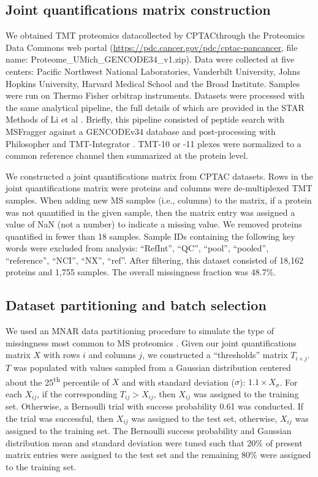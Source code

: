 \documentclass{article}
\begin{document}
\subsection{Joint quantifications matrix construction}
\label{sec:joint-mat}

We obtained TMT proteomics data\textemdash collected by CPTAC\textemdash through the Proteomics Data Commons web portal (\url{https://pdc.cancer.gov/pdc/cptac-pancancer}, file name: Proteome\_UMich\_GENCODE34\_v1.zip). Data were collected at five centers: Pacific Northwest National Laboratories, Vanderbilt University, Johns Hopkins University, Harvard Medical School and the Broad Institute. Samples were run on Thermo Fisher orbitrap instruments. Datasets were processed with the same analytical pipeline, the full details of which are provided in the STAR Methods of Li et al \cite{pan-cancer}. Briefly, this pipeline consisted of peptide search with MSFragger \cite{msfragger} against a GENCODEv34 database and post-processing with Philosopher \cite{philosopher} and TMT-Integrator \cite{msfragger}. TMT-10 or -11 plexes were normalized to a common reference channel then summarized at the protein level. 

We constructed a joint quantifications matrix from CPTAC datasets. Rows in the joint quantifications matrix were proteins and columns were de-multiplexed TMT samples. When adding new MS samples (i.e., columns) to the matrix, if a protein was not quantified in the given sample, then the matrix entry was assigned a value of NaN (not a number) to indicate a missing value. We removed proteins quantified in fewer than 18 samples. Sample IDs containing the following key words were excluded from analysis: ``RefInt'', ``QC'', ``pool'', ``pooled'', ``reference'', ``NCI'', ``NX'', ``ref''. After filtering, this dataset consisted of 18,162 proteins and 1,755 samples. The overall missingness fraction was 48.7\%. 

\subsection{Dataset partitioning and batch selection}
\label{sec:partition}

We used an MNAR data partitioning procedure to simulate the type of missingness most common to MS proteomics \cite{Bramer:review, Webb-Robertson:review, mengbo-2023}. Given our joint quantifications matrix $X$ with rows $i$ and columns $j$, we constructed a ``thresholds'' matrix $T_{i\times j}$. $T$ was populated with values sampled from a Gaussian distribution centered about the 25\textsuperscript{th} percentile of $X$ and with standard deviation ($\sigma$): $1.1\times X_{\sigma}$. For each $X_{ij}$, if the corresponding $T_{ij}$$>$$X_{ij}$, then $X_{ij}$ was assigned to the training set. Otherwise, a Bernoulli trial with success probability 0.61 was conducted. If the trial was successful, then $X_{ij}$ was assigned to the test set, otherwise, $X_{ij}$ was assigned to the training set. The Bernoulli success probability and Gaussian distribution mean and standard deviation were tuned such that 20\% of present matrix entries were assigned to the test set and the remaining 80\% were assigned to the training set. 
\end{document}
